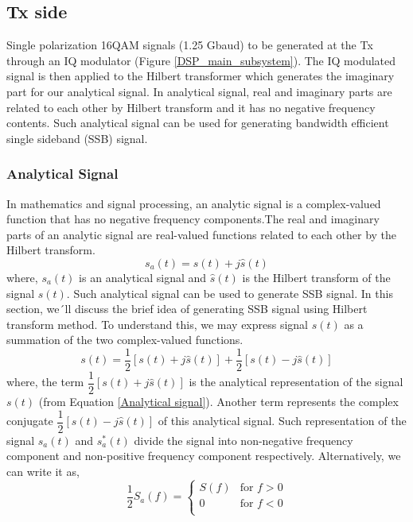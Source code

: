 \subsection{Tx side}
Single polarization 16QAM signals (1.25 Gbaud) to be generated at the Tx through an IQ modulator (Figure \ref{DSP_main_subsystem}). The IQ modulated signal is then applied to the Hilbert transformer which generates the imaginary part for our analytical signal. In analytical signal, real and imaginary parts are related to each other by Hilbert transform and it has no negative frequency contents. Such analytical signal can be used for generating bandwidth efficient single sideband (SSB) signal.

\subsubsection{Analytical Signal}
In mathematics and signal processing, an analytic signal is a complex-valued function that has no negative frequency components.The real and imaginary parts of an analytic signal are real-valued functions related to each other by the Hilbert transform.
\begin{equation}
s_a(t)=s(t)+j\hat{s}(t)
\label{Analytical signal}
\end{equation}
where, $s_a(t)$ is an analytical signal and $\hat{s}(t)$ is the Hilbert transform of the signal ${s}(t)$. Such analytical signal can be used to generate SSB signal. In this section, we´ll discuss the brief idea of generating SSB signal using Hilbert transform method. To understand this, we may express signal $s(t)$ as a summation of the two complex-valued functions.
\begin{equation}
s(t)=\dfrac{1}{2}[s(t)+j\hat{s}(t)]+\dfrac{1}{2}[s(t)-j\hat{s}(t)]
\label{}
\end{equation}
where, the term $\dfrac{1}{2}[s(t)+j\hat{s}(t)]$ is the analytical representation of the signal $s(t)$ (from Equation \ref{Analytical signal}). Another term represents the complex conjugate $\dfrac{1}{2}[s(t)-j\hat{s}(t)]$ of this analytical signal. Such representation of the signal ${s_a}(t)$ and ${s_a^*}(t)$ divide the signal into non-negative frequency component and non-positive frequency component respectively. Alternatively, we can write it as,
\begin{equation}
	\dfrac{1}{2}{S_a}(f) = \begin{cases}
		S(f) &\text{for $f>0$}\\
		0    &\text{for $f<0$}\\
	\end{cases}
\end{equation}
